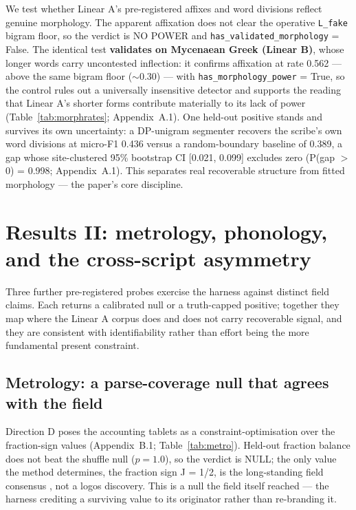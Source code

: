 We test whether Linear A's pre-registered affixes and word divisions
reflect genuine morphology. The apparent affixation does not clear the
operative \texttt{L\_fake} bigram floor, so the verdict is NO POWER and
\texttt{has\_validated\_morphology} = False. The identical test
\textbf{validates on Mycenaean Greek (Linear B)}, whose longer words carry
uncontested inflection: it confirms affixation at rate 0.562 --- above the
same bigram floor ($\sim$0.30) --- with \texttt{has\_morphology\_power} =
True, so the control rules out a universally insensitive detector and
supports the reading that Linear A's shorter forms contribute materially to
its lack of power (Table~\ref{tab:morphrates}; Appendix~A.1). One held-out positive stands and survives
its own uncertainty: a DP-unigram segmenter recovers the scribe's own word
divisions at micro-F1 0.436 versus a random-boundary baseline of 0.389, a
gap whose site-clustered 95\% bootstrap CI [0.021, 0.099] excludes zero
(P(gap $>$ 0) = 0.998; Appendix~A.1). This
separates real recoverable structure from fitted morphology --- the paper's
core discipline.

\section{Results II: metrology, phonology, and the cross-script asymmetry}

Three further pre-registered probes exercise the harness against distinct
field claims. Each returns a calibrated null or a truth-capped positive;
together they map where the Linear A corpus does and does not carry
recoverable signal, and they are consistent with identifiability rather
than effort being the more fundamental present constraint.

\subsection{Metrology: a parse-coverage null that agrees with the field}

Direction D poses the accounting tablets as a constraint-optimisation
over the fraction-sign values (Appendix~B.1; Table~\ref{tab:metro}).
Held-out fraction balance
does not beat the shuffle null
($p = 1.0$), so the verdict is NULL; the only value the method determines,
the fraction sign J = 1/2, is the long-standing field consensus
\citep{bennett1950}, not a logos discovery. This is a null the field itself
reached \citep{corazza2021} --- the harness crediting a surviving value to
its originator rather than re-branding it.

